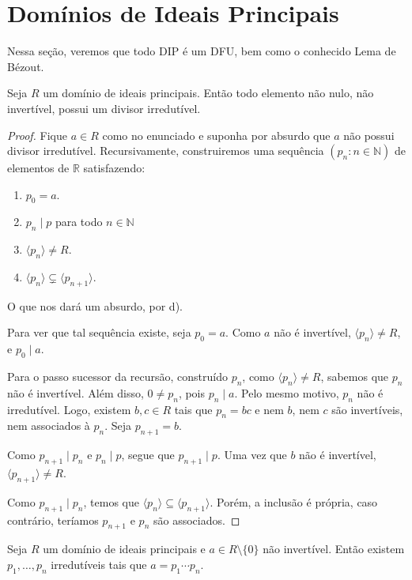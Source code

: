 \section{Domínios de Ideais Principais}
Nessa seção, veremos que todo DIP é um DFU, bem como o conhecido Lema de Bézout.
\begin{lemma}
Seja $R$ um domínio de ideais principais. Então todo elemento não nulo, não invertível, possui um divisor irredutível.
\end{lemma}
\begin{proof}
    Fique $a \in R$ como no enunciado e suponha por absurdo que $a$ não possui divisor irredutível. Recursivamente, construiremos uma sequência $(p_n: n \in \mathbb N)$ de elementos de $\mathbb R$ satisfazendo:
    \begin{enumerate}[label=\alph*)]
        \item $p_0=a$.
        \item $p_n\mid p$ para todo $n \in \mathbb N$
        \item $\langle p_n\rangle\neq R$.
        \item $\langle p_n\rangle\subsetneq \langle p_{n+1}\rangle$.
    \end{enumerate}
    O que nos dará um absurdo, por d).

    Para ver que tal sequência existe, seja $p_0=a$. Como $a$ não é invertível, $\langle p_n\rangle \neq R$, e $p_0\mid a$.

    Para o passo sucessor da recursão, construído $p_n$, como $\langle p_n\rangle\neq R$, sabemos que $p_n$ não é invertível.
    Além disso, $0\neq p_n$, pois $p_n\mid a$.
    Pelo mesmo motivo, $p_n$ não é irredutível.
    Logo, existem $b, c \in R$ tais que $p_n=bc$ e nem $b$, nem $c$ são invertíveis, nem associados à $p_n$.
    Seja $p_{n+1}=b$.

    Como $p_{n+1}\mid p_n$ e $p_n\mid p$, segue que $p_{n+1}\mid p$.
    Uma vez que $b$ não é invertível, $\langle p_{n+1}\rangle\neq R$.

    Como $p_{n+1}\mid p_n$, temos que $\langle p_n\rangle\subseteq \langle p_{n+1}\rangle$.
    Porém, a inclusão é própria, caso contrário, teríamos $p_{n+1}$ e $p_n$ são associados.
\end{proof}

\begin{lemma}
    Seja $R$ um domínio de ideais principais e $a\in R\setminus \{0\}$ não invertível.
    Então existem $p_1, \dots, p_n$ irredutíveis tais que $a=p_1\cdots p_n$.
\end{lemma}


